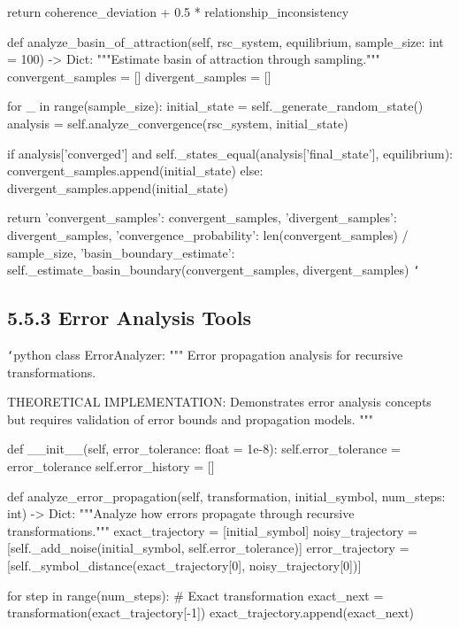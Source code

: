         return coherence_deviation + 0.5 * relationship_inconsistency
        
    def analyze_basin_of_attraction(self, rsc_system, equilibrium, sample_size: int = 100) -> Dict:
        """Estimate basin of attraction through sampling."""
        convergent_samples = []
        divergent_samples = []
        
        for _ in range(sample_size):
            initial_state = self._generate_random_state()
            analysis = self.analyze_convergence(rsc_system, initial_state)
            
            if analysis['converged'] and self._states_equal(analysis['final_state'], equilibrium):
                convergent_samples.append(initial_state)
            else:
                divergent_samples.append(initial_state)
                
        return {
            'convergent_samples': convergent_samples,
            'divergent_samples': divergent_samples,
            'convergence_probability': len(convergent_samples) / sample_size,
            'basin_boundary_estimate': self._estimate_basin_boundary(convergent_samples, divergent_samples)
        }
\texttt{`}

\subsection{5.5.3 Error Analysis Tools}

\texttt{`}python
class ErrorAnalyzer:
    """
    Error propagation analysis for recursive transformations.
    
    THEORETICAL IMPLEMENTATION: Demonstrates error analysis concepts
    but requires validation of error bounds and propagation models.
    """
    
    def __init__(self, error_tolerance: float = 1e-8):
        self.error_tolerance = error_tolerance
        self.error_history = []
        
    def analyze_error_propagation(self, transformation, initial_symbol, num_steps: int) -> Dict:
        """Analyze how errors propagate through recursive transformations."""
        exact_trajectory = [initial_symbol]
        noisy_trajectory = [self._add_noise(initial_symbol, self.error_tolerance)]
        error_trajectory = [self._symbol_distance(exact_trajectory[0], noisy_trajectory[0])]
        
        for step in range(num_steps):
            \# Exact transformation
            exact_next = transformation(exact_trajectory[-1])
            exact_trajectory.append(exact_next)
            
